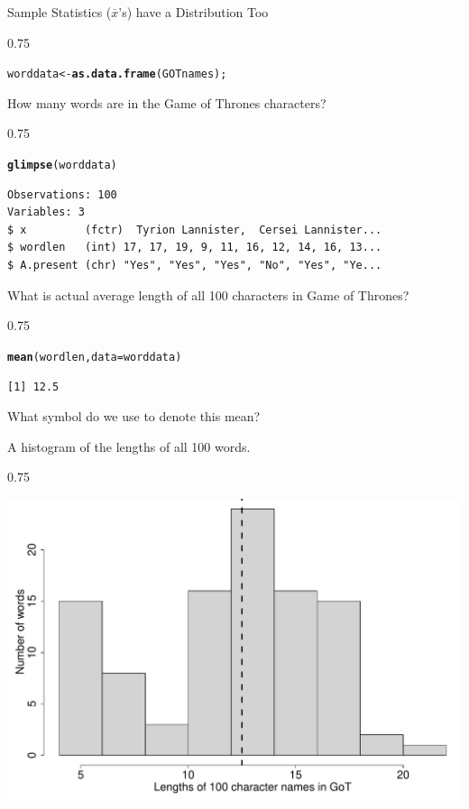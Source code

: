 \documentclass{beamer}\usepackage[]{graphicx}\usepackage[]{color}
\makeatletter
\newcommand{\hlstd}[1]{\textcolor[rgb]{0.102,0.102,0.102}{#1}}%
\newcommand{\hlkwb}[1]{\textcolor[rgb]{0.102,0.102,0.102}{#1}}%
\newcommand{\hlkwc}[1]{\textcolor[rgb]{0.2,0.2,0.2}{#1}}%
\newcommand{\hlkwd}[1]{\textcolor[rgb]{0.102,0.102,0.102}{\textbf{#1}}}%
\newenvironment{kframe}{%
 \def\at@end@of@kframe{}%
 \ifinner\ifhmode%
  \def\at@end@of@kframe{\end{minipage}}%
  \begin{minipage}{\columnwidth}%
 \fi\fi%
 \def\FrameCommand##1{\hskip\@totalleftmargin \hskip-\fboxsep
 \colorbox{shadecolor}{##1}\hskip-\fboxsep
     \hskip-\linewidth \hskip-\@totalleftmargin \hskip\columnwidth}%
 \MakeFramed {\advance\hsize-\width
   \@totalleftmargin\z@ \linewidth\hsize
   \@setminipage}}%
 {\par\unskip\endMakeFramed%
 \at@end@of@kframe}
\newenvironment{knitrout}{}{} %
\renewenvironment{knitrout}{\begin{spacing}{0.75}\begin{tiny}}{\end{tiny}\end{spacing}}
\newcommand{\xbar}{\overline{x}}
\makeatother
\begin{document}
\begin{frame}{Sample Statistics ($\xbar$'s) have a Distribution Too\;\;}
\begin{knitrout}\small
{}\color{fgcolor}\begin{kframe}
\begin{alltt}
\hlstd{worddata} \hlkwb{<-} \hlkwd{as.data.frame}\hlstd{(GOTnames);}
\end{alltt}
\end{kframe}
\end{knitrout}
How many words are in the Game of Thrones characters?
\begin{knitrout}\small
{}\color{fgcolor}\begin{kframe}
\begin{alltt}
\hlkwd{glimpse}\hlstd{(worddata)}
\end{alltt}
\begin{verbatim}
Observations: 100
Variables: 3
$ x         (fctr)  Tyrion Lannister,  Cersei Lannister...
$ wordlen   (int) 17, 17, 19, 9, 11, 16, 12, 14, 16, 13...
$ A.present (chr) "Yes", "Yes", "Yes", "No", "Yes", "Ye...
\end{verbatim}
\end{kframe}
\end{knitrout}

What is actual average length of all 100 characters in Game of Thrones?
\begin{knitrout}\small
{}\color{fgcolor}\begin{kframe}
\begin{alltt}
\hlkwd{mean}\hlstd{(wordlen,} \hlkwc{data}\hlstd{=worddata)}
\end{alltt}
\begin{verbatim}
[1] 12.5
\end{verbatim}
\end{kframe}
\end{knitrout}

What symbol do we use to denote this mean?

\newpage

A histogram of the lengths of all 100 words.

\begin{knitrout}\small
{}\color{fgcolor}

{\centering \includegraphics[width=0.79\linewidth]{figure/graphics-histogram-humanSampleMeans-3-1} 

}
\end{knitrout}
\end{frame}
\end{document}
